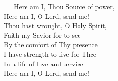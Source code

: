 \documentclass[
]{book}
\begin{document}
~~~Here am I, Thou Source of power,\\
\hspace*{0.333em}\hspace*{0.333em}\hspace*{0.333em}Here am I, O Lord, send me!\\
\hspace*{0.333em}\hspace*{0.333em}\hspace*{0.333em}Thou hast wrought, O Holy Spirit,\\
\hspace*{0.333em}\hspace*{0.333em}\hspace*{0.333em}Faith my Savior for to see\\
\hspace*{0.333em}\hspace*{0.333em}\hspace*{0.333em}By the comfort of Thy presence\\
\hspace*{0.333em}\hspace*{0.333em}\hspace*{0.333em}I have strength to live for Thee\\
\hspace*{0.333em}\hspace*{0.333em}\hspace*{0.333em}In a life of love and service --\\
\hspace*{0.333em}\hspace*{0.333em}\hspace*{0.333em}Here am I, O Lord, send me!
\end{document}
